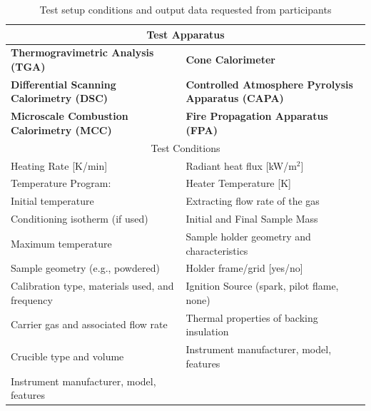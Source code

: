 \documentclass{book}
\begin{document}
\begin{table}[ht]
\caption{Test setup conditions and output data requested from participants}
\label{Table:Tests_Performed}
\begin{center}
\begin{tabular}{ll}
\hline
\multicolumn{2}{c}{Test Apparatus}                                                                       \\ \hline
 \textbf{Thermogravimetric Analysis (TGA)}         &  \textbf{Cone Calorimeter}              \\
 \textbf{Differential Scanning Calorimetry (DSC)} &  \textbf{Controlled Atmosphere Pyrolysis Apparatus (CAPA)}                                     \\
 \textbf{Microscale Combustion Calorimetry (MCC)}                  &  \textbf{Fire Propagation Apparatus (FPA)}     \\
\hline
\multicolumn{2}{c}{Test Conditions}                                                                      \\ \hline
Heating Rate [K/min]                              	& Radiant heat flux [kW/m$^2$]                        \\
Temperature Program:                              	& Heater Temperature [K]                                   \\
\hspace{.1in} Initial temperature             	& Extracting flow rate of the gas                      \\
\hspace{.1in} Conditioning isotherm (if used)     & Initial and Final Sample Mass                        \\
\hspace{.1in} Maximum temperature     	& Sample holder geometry and characteristics           \\
Sample geometry (e.g., powdered)           	& Holder frame/grid [yes/no]\\
Calibration type, materials used, and frequency   & Ignition Source (spark, pilot flame, none)\\
Carrier gas and associated flow rate        	& Thermal properties of backing insulation\\
Crucible type and volume                          	& Instrument manufacturer, model, features                                                     \\
Instrument manufacturer, model, features       	&                                                      \\

\end{tabular}
\end{center}
\end{table}
\end{document}
